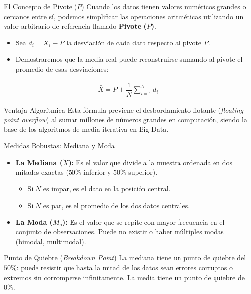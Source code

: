 \documentclass[10pt,aspectratio=169]{beamer}
\begin{document}
\begin{frame}{El Concepto de Pivote ($P$)}
  Cuando los datos tienen valores numéricos grandes o cercanos entre sí, podemos simplificar las operaciones aritméticas utilizando un valor arbitrario de referencia llamado \textbf{Pivote ($P$)}. \pause
  \begin{itemize}
    \item Sea $d_i = X_i - P$ la desviación de cada dato respecto al pivote $P$. \pause
    \item Demostraremos que la media real puede reconstruirse sumando al pivote el promedio de esas desviaciones:
  \end{itemize}
  \begin{align}
    \bar{X} = P + \dfrac{1}{N} \sum_{i=1}^{N} d_i
  \end{align}
  \pause
  \begin{block}{Ventaja Algorítmica}
    Esta fórmula previene el desbordamiento flotante (\emph{floating-point overflow}) al sumar millones de números grandes en computación, siendo la base de los algoritmos de media iterativa en Big Data.
  \end{block}
\end{frame}

\begin{frame}{Medidas Robustas: Mediana y Moda}
  \begin{itemize}
    \item \textbf{La Mediana ($\tilde{X}$):} Es el valor que divide a la muestra ordenada en dos mitades exactas ($50\%$ inferior y $50\%$ superior).
      \begin{itemize}
        \item Si $N$ es impar, es el dato en la posición central.
        \item Si $N$ es par, es el promedio de los dos datos centrales.
      \end{itemize}
    \pause
    \item \textbf{La Moda ($M_o$):} Es el valor que se repite con mayor frecuencia en el conjunto de observaciones. Puede no existir o haber múltiples modas (bimodal, multimodal). \pause
  \end{itemize}
  \vspace{0.4em}
  \begin{block}{Punto de Quiebre (\emph{Breakdown Point})}
    La mediana tiene un punto de quiebre del $50\%$: puede resistir que hasta la mitad de los datos sean errores corruptos o extremos sin corromperse infinitamente. La media tiene un punto de quiebre de $0\%$.
  \end{block}
\end{frame}
\end{document}
